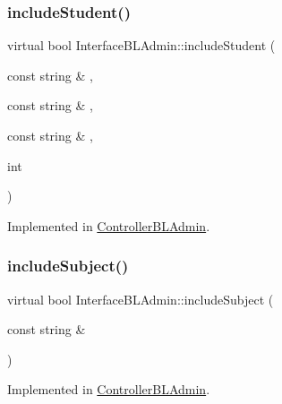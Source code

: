 \mbox{\label{class_interface_b_l_admin_a716e03cae2e978d281f813ea98137191}} 
\subsubsection{\texorpdfstring{include\+Student()}{includeStudent()}}
{\footnotesize\ttfamily virtual bool Interface\+B\+L\+Admin\+::include\+Student (\begin{DoxyParamCaption}\item[{const string \&}]{,  }\item[{const string \&}]{,  }\item[{const string \&}]{,  }\item[{int}]{ }\end{DoxyParamCaption})\hspace{0.3cm}{\ttfamily [pure virtual]}}



Implemented in \hyperlink{class_controller_b_l_admin_a6e077c2cf0d0420c4104a637e930b764}{Controller\+B\+L\+Admin}.

\mbox{\label{class_interface_b_l_admin_aa0b718aa7b0f47adad6601c7470fb8c4}} 
\subsubsection{\texorpdfstring{include\+Subject()}{includeSubject()}}
{\footnotesize\ttfamily virtual bool Interface\+B\+L\+Admin\+::include\+Subject (\begin{DoxyParamCaption}\item[{const string \&}]{ }\end{DoxyParamCaption})\hspace{0.3cm}{\ttfamily [pure virtual]}}



Implemented in \hyperlink{class_controller_b_l_admin_a6c78d14f6b7fa350a63c5dbb2ac31084}{Controller\+B\+L\+Admin}.

\mbox{\label{class_interface_b_l_admin_aa1d0fe6d4886260d1aa47d7bf73ad9ff}} 
